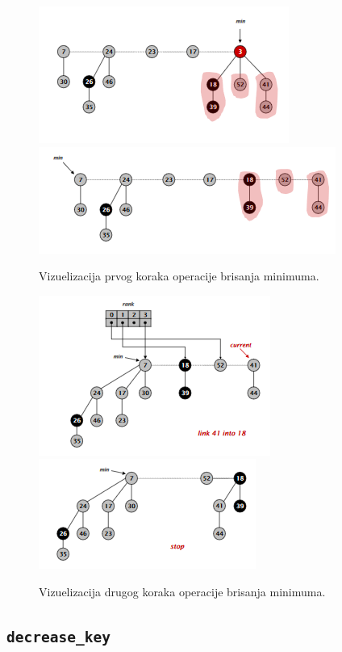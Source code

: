 \documentclass[a4paper]{article}
\theoremstyle{plain}
\theoremstyle{definition}
\begin{document}
\begin{figure}[H]
    \centering
    \includegraphics[scale=0.7]{resources/fig4a.PNG}\\
    \includegraphics[scale=0.7]{resources/fig4b.PNG}
    \caption{Vizuelizacija prvog koraka operacije brisanja minimuma.}
    \label{fig4a}
\end{figure}
\begin{figure}[H]
    \centering
    \includegraphics[scale=0.7]{resources/fig4c.PNG}\\
    \includegraphics[scale=0.7]{resources/fig4d.PNG}
    \caption{Vizuelizacija drugog koraka operacije brisanja minimuma.}
    \label{fig4b}
\end{figure}


\subsection{\texttt{decrease\_key}}
\label{subsec:decreasekey}
\end{document}
